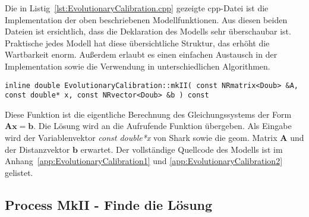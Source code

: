 %
%

%
Die in Listig~\ref{lst:EvolutionaryCalibration.cpp} gezeigte cpp-Datei ist die Implementation der oben beschriebenen Modellfunktionen. Aus diesen beiden Dateien ist ersichtlich, dass die Deklaration des Modells sehr überschaubar ist. Praktische jedes Modell hat diese übersichtliche Struktur, das erhöht die Wartbarkeit enorm. Außerdem erlaubt es einen einfachen Austausch in der Implementation sowie die Verwendung in unterschiedlichen Algorithmen. 
%
\begin{lstlisting}[label=EvolutionaryCalibration_4]
inline double EvolutionaryCalibration::mkII( const NRmatrix<Doub> &A, const double* x, const NRvector<Doub> &b ) const
\end{lstlisting}
%
Diese Funktion ist die eigentliche Berechnung des Gleichungssystems der Form $\mathbf{A}\mathbf{x}=\textbf{b}$. Die Lösung wird an die Aufrufende Funktion übergeben. Als Eingabe wird der Variablenvektor \textit{const double*x} von Shark sowie die geom. Matrix $\mathbf{A}$ und der Distanzvektor $\mathbf{b}$ erwartet.
%
Der vollständige Quellcode des Modells ist im Anhang~\ref{app:EvolutionaryCalibration1} und \ref{app:EvolutionaryCalibration2} gelistet.
%
%

%
%
\subsection{Process MkII - Finde die Lösung}

%
